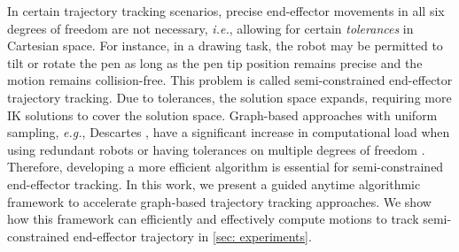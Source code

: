 In certain trajectory tracking scenarios, precise end-effector movements in all six degrees of freedom are not necessary, \textit{i.e.}, allowing for certain \textit{tolerances} in Cartesian space. For instance, in a drawing task, the robot may be permitted to tilt or rotate the pen as long as the pen tip position remains precise and the motion remains collision-free. This problem is called semi-constrained end-effector trajectory tracking.
Due to tolerances, the solution space expands, requiring more IK solutions to cover the solution space. 
Graph-based approaches with uniform sampling, \textit{e.g.}, Descartes \cite{Descartes}, have a significant increase in computational load when using redundant robots or having tolerances on multiple degrees of freedom \cite{de2017cartesian}. Therefore, developing a more efficient algorithm is essential for semi-constrained end-effector tracking. In this work, we present a guided anytime algorithmic framework to accelerate graph-based trajectory tracking approaches. We show how this framework can efficiently and effectively compute motions to track semi-constrained end-effector trajectory in \cref{sec: experiments}.

